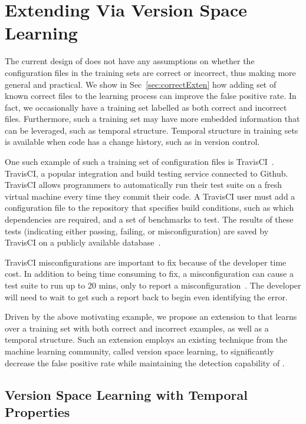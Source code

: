 
\section{Extending \app Via Version Space Learning}
\label{sec:travis}

The current design of \app does not have any assumptions on whether the
configuration files in the training sets are correct or 
incorrect, thus making \app more general and practical.
We show in Sec~\ref{sec:correctExten} how adding set of known correct files to 
the learning process can improve the false positive rate.
In fact, we occasionally have a training set labelled as both correct and incorrect files.
Furthermore, such a training set may have more embedded information that can be leveraged, such as temporal structure.
Temporal structure in training sets is available when code has a change history, such as in version control.

One such example of such a training set of configuration files is TravisCI~\cite{API}.
TravisCI, a popular integration and build testing service connected to Github.
TravisCI allows programmers to automatically run their test suite on a fresh virtual machine every time they commit their code.
A TravisCI user must add a configuration file to the repository that specifies build conditions, 
such as which dependencies are required, and a set of benchmarks to test. 
The results of these tests (indicating either passing, failing, or misconfiguration) 
are saved by TravisCI on a publicly available database~\cite{API}.

TravisCI misconfigurations are important to fix because of the developer time cost. 
In addition to being time consuming to fix, a misconfiguration can cause a test suite to run up to 20 mins, only to report a misconfiguration~\cite{API}.
The developer will need to wait to get such a report back to begin even identifying the error.

Driven by the above motivating example, we propose an extension to \app that
learns over a training set with both correct and incorrect examples, as well as a temporal structure.
Such an extension employs an existing technique from the machine learning community, called version space learning,
to significantly decrease the false positive rate while maintaining the detection capability of \app.

\subsection{Version Space Learning with Temporal Properties} 

